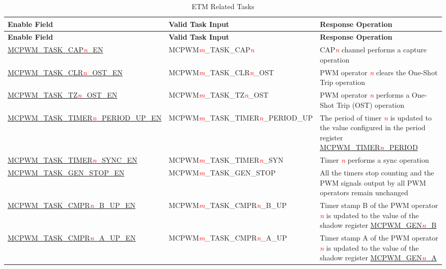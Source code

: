 \begin{longtable}{ | l | l | L{5cm} |}
    \caption{ETM Related Tasks}
    \label{tab:mcpwm-etm-task}
    \\\hline
   \textbf{Enable Field} & \textbf{Valid Task Input} & \textbf{Response Operation} \\\hline
    \endfirsthead
    \hline
    \textbf{Enable Field} & \textbf{Valid Task Input} & \textbf{Response Operation} \\\hline
    \endhead
    \hline
    \endfoot
    
    \hyperref[fielddesc:MCPWMTASKCAP0EN]{MCPWM\_TASK\_CAP\textcolor{red}{\it{n}}\_EN}
    &  MCPWM\textcolor{red}{\it{m}}\_TASK\_CAP\textcolor{red}{\it{n}}
    &  CAP\textcolor{red}{\it{n}} channel performs a capture operation \\\hline
    \hyperref[fielddesc:MCPWMTASKCLR0OSTEN]{MCPWM\_TASK\_CLR\textcolor{red}{\it{n}}\_OST\_EN}
    &  MCPWM\textcolor{red}{\it{m}}\_TASK\_CLR\textcolor{red}{\it{n}}\_OST
    &  PWM operator \textcolor{red}{\it{n}} clears the One-Shot Trip operation \\\hline
    \hyperref[fielddesc:MCPWMTASKTZ0OSTEN]{MCPWM\_TASK\_TZ\textcolor{red}{\it{n}}\_OST\_EN}
    &  MCPWM\textcolor{red}{\it{m}}\_TASK\_TZ\textcolor{red}{\it{n}}\_OST
    &  PWM operator \textcolor{red}{\it{n}} performs a One-Shot Trip (OST) operation \\\hline
    \hyperref[fielddesc:MCPWMTASKTIMER0PERIODUPEN]{MCPWM\_TASK\_TIMER\textcolor{red}{\it{n}}\_PERIOD\_UP\_EN}
    &  MCPWM\textcolor{red}{\it{m}}\_TASK\_TIMER\textcolor{red}{\it{n}}\_PERIOD\_UP
    &  The period of timer \textcolor{red}{\it{n}} is updated to the value configured in the period register \hyperref[fielddesc:MCPWMTIMERNPERIOD]{MCPWM\_TIMER\textcolor{red}{\it{n}}\_PERIOD} \\\hline
    \hyperref[fielddesc:MCPWMTASKTIMER0SYNCEN]{MCPWM\_TASK\_TIMER\textcolor{red}{\it{n}}\_SYNC\_EN}
    &  MCPWM\textcolor{red}{\it{m}}\_TASK\_TIMER\textcolor{red}{\it{n}}\_SYN
    &  Timer \textcolor{red}{\it{n}} performs a sync operation \\\hline
    \hyperref[fielddesc:MCPWMTASKGENSTOPEN]{MCPWM\_TASK\_GEN\_STOP\_EN}
    &  MCPWM\textcolor{red}{\it{m}}\_TASK\_GEN\_STOP
    &  All the timers stop counting and the PWM signals output by all PWM operators remain unchanged \\\hline
    \hyperref[fielddesc:MCPWMTASKCMPR0BUPEN]{MCPWM\_TASK\_CMPR\textcolor{red}{\it{n}}\_B\_UP\_EN}
    &  MCPWM\textcolor{red}{\it{m}}\_TASK\_CMPR\textcolor{red}{\it{n}}\_B\_UP
    &  Timer stamp B of the PWM operator \textcolor{red}{\it{n}} is updated to the value of the shadow register \hyperref[regdesc:MCPWMGENNBREG]{MCPWM\_GEN\textcolor{red}{\it{n}}\_B} \\\hline
    \hyperref[fielddesc:MCPWMTASKCMPR0AUPEN]{MCPWM\_TASK\_CMPR\textcolor{red}{\it{n}}\_A\_UP\_EN}
    &  MCPWM\textcolor{red}{\it{m}}\_TASK\_CMPR\textcolor{red}{\it{n}}\_A\_UP
    &  Timer stamp A of the PWM operator \textcolor{red}{\it{n}} is updated to the value of the shadow register \hyperref[regdesc:MCPWMGENNAREG]{MCPWM\_GEN\textcolor{red}{\it{n}}\_A} \\\hline
\end{longtable}